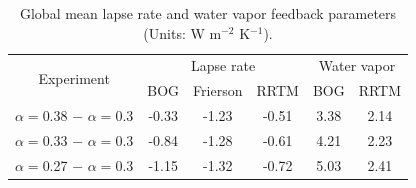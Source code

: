 
\begin{table}[ht]
	\centering
	\small
	\caption{Global mean lapse rate and water vapor feedback parameters (Units: W m$^{-2}$ K$^{-1}$).}
	\vspace{0.5em}
	\label{tab:lapserate_and_wv_fb}
	\begin{tabular}{cccccc}
		\toprule
		\multirow{2}{*}{Experiment} & \multicolumn{3}{c}{Lapse rate} & \multicolumn{2}{c}{Water vapor} \\\cline{2-4}\cline{5-6}
		{} & BOG & Frierson & RRTM & BOG & RRTM\\
		\midrule
		$\alpha=$0.38 $-$ $\alpha=$0.3 & -0.33 & -1.23 & -0.51 & 3.38 & 2.14 \\
		$\alpha=$0.33 $-$ $\alpha=$0.3 & -0.84 & -1.28 & -0.61 & 4.21 & 2.23 \\
		$\alpha=$0.27 $-$ $\alpha=$0.3 & -1.15 & -1.32 & -0.72 & 5.03 & 2.41 \\
		\bottomrule
	\end{tabular}
\end{table}

